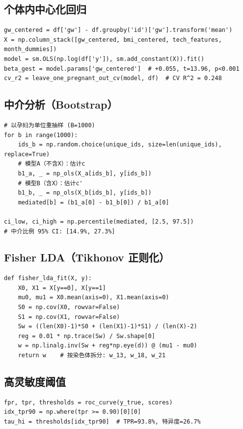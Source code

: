 \documentclass{mcm-paper}
\begin{document}
\subsection{个体内中心化回归}
\begin{verbatim}
gw_centered = df['gw'] - df.groupby('id')['gw'].transform('mean')
X = np.column_stack([gw_centered, bmi_centered, tech_features, month_dummies])
model = sm.OLS(np.log(df['y']), sm.add_constant(X)).fit()
beta_gest = model.params['gw_centered']  # +0.055, t=13.96, p<0.001
cv_r2 = leave_one_pregnant_out_cv(model, df)  # CV R^2 = 0.248
\end{verbatim}

\subsection{中介分析（Bootstrap）}
\begin{verbatim}
# 以孕妇为单位重抽样 (B=1000)
for b in range(1000):
    ids_b = np.random.choice(unique_ids, size=len(unique_ids), replace=True)
    # 模型A（不含X）：估计c
    b1_a, _ = np_ols(X_a[ids_b], y[ids_b])
    # 模型B（含X）：估计c'
    b1_b, _ = np_ols(X_b[ids_b], y[ids_b])
    mediated[b] = (b1_a[0] - b1_b[0]) / b1_a[0]

ci_low, ci_high = np.percentile(mediated, [2.5, 97.5])
# 中介比例 95% CI: [14.9%, 27.3%]
\end{verbatim}

\subsection{Fisher LDA（Tikhonov 正则化）}
\begin{verbatim}
def fisher_lda_fit(X, y):
    X0, X1 = X[y==0], X[y==1]
    mu0, mu1 = X0.mean(axis=0), X1.mean(axis=0)
    S0 = np.cov(X0, rowvar=False)
    S1 = np.cov(X1, rowvar=False)
    Sw = ((len(X0)-1)*S0 + (len(X1)-1)*S1) / (len(X)-2)
    reg = 0.01 * np.trace(Sw) / Sw.shape[0]
    w = np.linalg.inv(Sw + reg*np.eye(d)) @ (mu1 - mu0)
    return w    # 按染色体拆分: w_13, w_18, w_21
\end{verbatim}

\subsection{高灵敏度阈值}
\begin{verbatim}
fpr, tpr, thresholds = roc_curve(y_true, scores)
idx_tpr90 = np.where(tpr >= 0.90)[0][0]
tau_hi = thresholds[idx_tpr90]  # TPR=93.8%, 特异度=26.7%
\end{verbatim}
\end{document}
